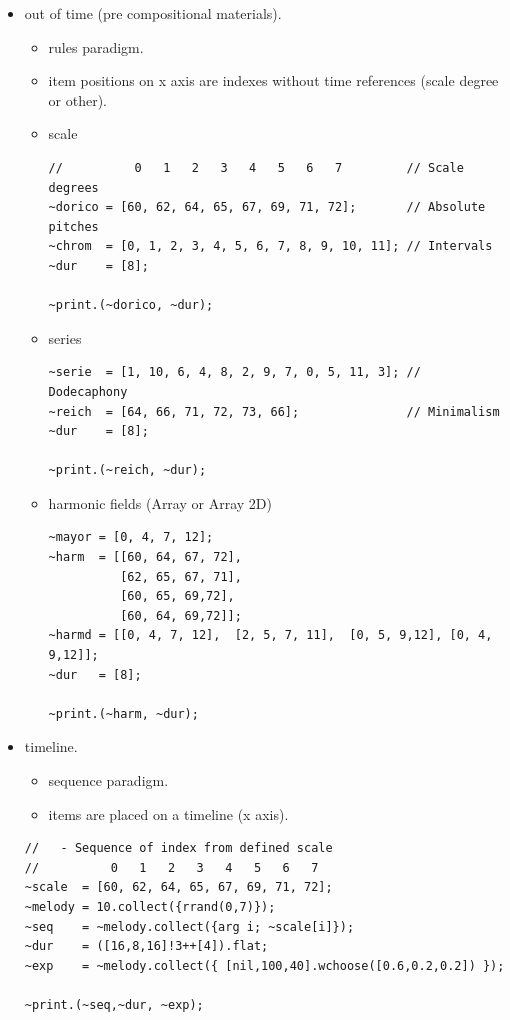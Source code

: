 \begin{itemize}
\tightlist
\item out of time (pre compositional materials).
  \begin{itemize}
  \tightlist
  \item rules paradigm.
  \item item positions on x axis are indexes without time references (scale degree or other).
  \item scale
\begin{lstlisting}[frame=single] 
//          0   1   2   3   4   5   6   7         // Scale degrees
~dorico = [60, 62, 64, 65, 67, 69, 71, 72];       // Absolute pitches
~chrom  = [0, 1, 2, 3, 4, 5, 6, 7, 8, 9, 10, 11]; // Intervals
~dur    = [8];

~print.(~dorico, ~dur);
\end{lstlisting}

  \item series
\begin{lstlisting}[frame=single] 
~serie  = [1, 10, 6, 4, 8, 2, 9, 7, 0, 5, 11, 3]; // Dodecaphony
~reich  = [64, 66, 71, 72, 73, 66];               // Minimalism
~dur    = [8];

~print.(~reich, ~dur);
\end{lstlisting}

  \item harmonic fields (Array or Array 2D)
\begin{lstlisting}[frame=single]
~mayor = [0, 4, 7, 12];
~harm  = [[60, 64, 67, 72], 
          [62, 65, 67, 71], 
          [60, 65, 69,72], 
          [60, 64, 69,72]];
~harmd = [[0, 4, 7, 12],  [2, 5, 7, 11],  [0, 5, 9,12], [0, 4, 9,12]];
~dur   = [8];

~print.(~harm, ~dur);
\end{lstlisting}
  \end{itemize}
  
\item timeline.

  \begin{itemize}
  \tightlist
  \item sequence paradigm.
  \item items are placed on a timeline (x axis).
  \end{itemize}

\begin{lstlisting}[frame=single] 
//   - Sequence of index from defined scale
//          0   1   2   3   4   5   6   7
~scale  = [60, 62, 64, 65, 67, 69, 71, 72];      
~melody = 10.collect({rrand(0,7)});
~seq    = ~melody.collect({arg i; ~scale[i]});               
~dur    = ([16,8,16]!3++[4]).flat; 
~exp    = ~melody.collect({ [nil,100,40].wchoose([0.6,0.2,0.2]) });

~print.(~seq,~dur, ~exp); 
\end{lstlisting}
\end{itemize}


